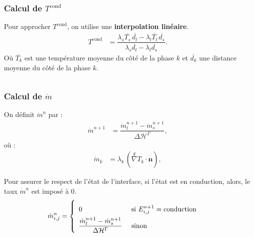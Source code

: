 \documentclass{beamer}
\newcommand{\cond}{\text{cond}}
\newcommand{\vect}[1]{\bm{#1}}
\newcommand{\norm}{\vect{n}}
\newcommand{\npl}{{n+1}}
\newcommand{\ghost}{\overset{{g}}{\nabla}}
\renewcommand{\frac}{\dfrac}
\newcommand{\Frac}{\displaystyle\frac}
\begin{document}
\begin{frame}
    \frametitle{Calcul de $ T^{\cond}$}
Pour approcher $T^{\text{cond}}$, on  utilise une \textbf{interpolation linéaire}.
    \begin{align}
    T^{\text{cond}} &= \Frac{\lambda_s \overline{T_s} \, \overline{d_l} - \lambda_l \overline{T_l}  \, \overline{d_s}}{\lambda_s \overline{d_l} - \lambda_l \overline{d_s}}.
\end{align}
\footnotesize
Où $\overline{T_k}$ est une température moyenne du côté de la phase $k$ et  $\overline{d_k}$ une distance moyenne du côté de la phase $k$.
\begin{columns}[c]
    \begin{column}{0.5 \textwidth}
\begin{center}
		\begin{tikzpicture}[scale = 0.45, every node/.style={scale=0.45}]
			
		\end{tikzpicture}

\end{center}
\end{column}
    \begin{column}{0.5 \textwidth}

\begin{center}
		\begin{tikzpicture}[scale = 0.5, every node/.style={scale=0.5}]
			
		\end{tikzpicture}

\end{center}
   \end{column}
   \end{columns}
\end{frame}


\begin{frame}
    \frametitle{Calcul de $\Dot{m}$}
	\footnotesize
On définit $\Dot{m}^n$ par : 
\begin{align} \label{eq:mPoint}
	\Dot{m}^\npl &= \frac{\Dot{m}_l^\npl - \Dot{m}_s^\npl}{\Delta \mathcal{H}^\Gamma},
\end{align}
où :
\begin{align} \label{eq:mPointk}
	\Dot{m}_k &= \lambda_k \, (\ghost T_k \cdot \norm),
\end{align}

Pour assurer le respect de l'état de l'interface, si l'état est en conduction, alors, le taux $\Dot{m}^n$ est imposé à $0$.
\begin{align}
	\Dot{m}^n_{i,j} &= \left\{ {\renewcommand{\arraystretch}{2}\begin{array}{l l} 
	0 &\text{ si } E_{i,j}^\npl = \text{conduction}\\
	\frac{\Dot{m}_l^\npl - \Dot{m}_s^\npl}{\Delta \mathcal{H}^\Gamma} &\text{ sinon }
	\end{array}}\right.	
\end{align}

\end{frame}
\end{document}
